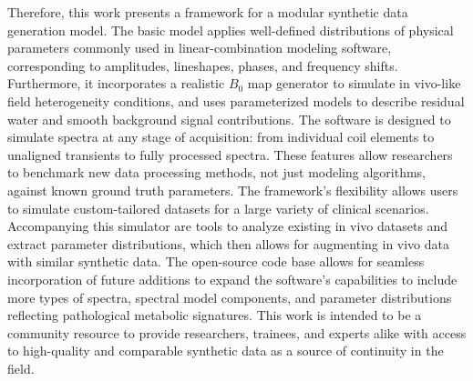 Therefore, this work presents
a framework for a modular synthetic data generation model. The basic model applies well-defined distributions of physical parameters commonly used in linear-combination modeling software, corresponding to amplitudes, lineshapes, phases, and frequency shifts. Furthermore, it incorporates a realistic $B_0$ map generator to simulate in vivo-like field heterogeneity conditions, and uses parameterized models to describe residual water and smooth background signal contributions. 
The software is designed to simulate spectra at any stage of acquisition: from individual coil elements to unaligned transients to fully processed spectra. These features allow researchers to benchmark new data processing methods, not just modeling algorithms, against known ground truth parameters. The framework's flexibility allows users to simulate custom-tailored datasets for a large variety of clinical scenarios. Accompanying this simulator are tools to analyze existing in vivo datasets and extract parameter distributions, which then allows for augmenting in vivo data with similar synthetic data. 
The open-source code base allows for seamless incorporation of future additions to expand the software's capabilities to include more types of spectra, spectral model components, and parameter distributions reflecting pathological metabolic signatures. This work is intended to be a community resource to provide researchers, trainees, and experts alike with access to high-quality and comparable synthetic data as a source of continuity in the field.


 
